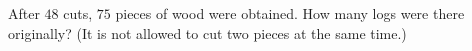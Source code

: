 After $48$ cuts, $75$ pieces of wood were obtained. How many logs were there originally? (It is not allowed to cut two pieces at the same time.)

